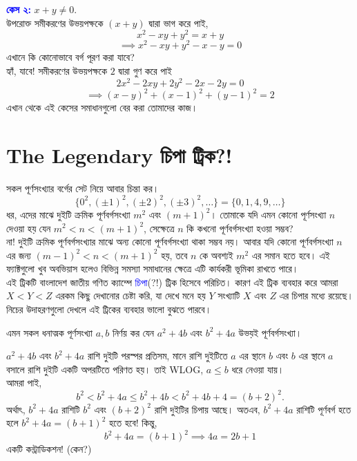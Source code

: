 \documentclass[11pt]{report}
\begin{document}
\textbf{\textcolor{blue}{কেস ২:}} $x+y \not = 0.$\\

উপরোক্ত সমীকরণের উভয়পক্ষকে $(x+y)$ দ্বারা ভাগ করে পাই, $$x^2-xy+y^2=x+y$$ $$\implies x^2-xy+y^2-x-y=0$$ এখানে কি কোনোভাবে বর্গ পূরণ করা যাবে?\\

হ্যাঁ, যাবে! সমীকরণের উভয়পক্ষকে $2$ দ্বারা গুণ করে পাই $$2x^2-2xy+2y^2-2x-2y=0$$ $$\implies (x-y)^2+(x-1)^2+(y-1)^2=2$$ এখান থেকে এই কেসের সমাধানগুলো বের করা তোমাদের কাজ।\\

\section{The Legendary চিপা ট্রিক?!}

সকল পূর্ণসংখ্যার বর্গের সেট নিয়ে আবার চিন্তা কর। $$\{0^2, (\pm 1)^2, (\pm 2)^2, (\pm 3)^2, \ldots\} = \{0, 1, 4, 9, \ldots\}$$ ধর, এদের মাঝে দুইটি ক্রমিক পূর্ণবর্গসংখ্যা $m^2$ এবং $(m+1)^2$। তোমাকে যদি এমন কোনো পূর্ণসংখ্যা $n$ দেওয়া হয় যেন $m^2 < n < (m+1)^2$, সেক্ষেত্রে $n$ কি কখনো পূর্ণবর্গসংখ্যা হওয়া সম্ভব?\\

না! দুইটি ক্রমিক পূর্ণবর্গসংখ্যার মাঝে অন্য কোনো পূর্ণবর্গসংখ্যা থাকা সম্ভব নয়। আবার যদি কোনো পূর্ণবর্গসংখ্যা $n$ এর জন্য $(m-1)^2 < n < (m+1)^2$ হয়, তবে $n$ কে অবশ্যই $m^2$ এর সমান হতে হবে। এই ফ্যাক্টগুলো খুব অবভিয়াস হলেও বিভিন্ন সমস্যা সমাধানের ক্ষেত্রে এটি কার্যকরী ভূমিকা রাখতে পারে।\\

এই ট্রিকটি বাংলাদেশ জাতীয় গণিত ক্যাম্পে \textcolor{blue}{চিপা}(?!) ট্রিক হিসেবে পরিচিত। কারণ এই ট্রিক ব্যবহার করে আমরা $X < Y < Z$ এরকম কিছু দেখানোর চেষ্টা করি, যা দেখে মনে হয় $Y$ সংখ্যাটি $X$ এবং $Z$ এর চিপার মধ্যে রয়েছে। নিচের উদাহরণগুলো দেখলে এই ট্রিকের ব্যবহার ভালো বুঝতে পারবে।\\

\begin{tcolorbox}[colframe=black!80!green,title=APMO 1999]
এমন সকল ধনাত্মক পূর্ণসংখ্যা $a, b$ নির্ণয় কর যেন $a^2+4b$ এবং $b^2+4a$ উভয়ই পূর্ণবর্গসংখ্যা।
\end{tcolorbox}

$a^2+4b$ এবং $b^2+4a$ রাশি দুইটি পরস্পর প্রতিসম, মানে রাশি দুইটিতে $a$ এর স্থানে $b$ এবং $b$ এর স্থানে $a$ বসালে রাশি দুইটি একটি অপরটিতে পরিণত হয়। তাই WLOG, $a \leq b$ ধরে নেওয়া যায়।\\

আমরা পাই, $$b^2 < b^2+4a \leq b^2+4b < b^2+4b+4 = (b+2)^2.$$ অর্থাৎ, $b^2+4a$ রাশিটি $b^2$ এবং $(b+2)^2$ রাশি দুইটির চিপায় আছে। অতএব, $b^2+4a$ রাশিটি পূর্ণবর্গ হতে হলে $b^2+4a = (b+1)^2$ হতে হবে! কিন্তু, $$b^2+4a = (b+1)^2 \implies 4a = 2b + 1$$ একটি কন্ট্রাডিকশন! (কেন?)\\
\end{document}
